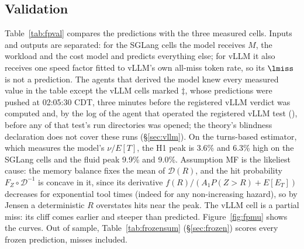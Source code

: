 \subsection{Validation}\label{sec:fp-val}
Table~\ref{tab:fpval} compares the predictions with the three measured cells. Inputs and outputs are separated: for the SGLang cells the model receives $M$, the workload and the cost model and predicts everything else; for vLLM it also receives one speed factor fitted to vLLM's own all-miss token rate, so its $\lmiss$ is not a prediction. The agents that derived the model knew every measured value in the table except the vLLM cells marked $\ddagger$, whose predictions were pushed at 02:05:30 CDT, three minutes before the registered vLLM verdict was computed and, by the log of the agent that operated the registered vLLM test (), before any of that test's run directories was opened; the theory's blindness declaration does not cover these runs (\S\ref{sec:vllm}). On the turns-based estimator, which measures the model's $\nu/E[T]$, the H1 peak is 3.6\% and 6.3\% high on the SGLang cells and the fluid peak 9.9\% and 9.0\%. Assumption MF is the likeliest cause: the memory balance fixes the mean of $\mathcal D(R)$, and the hit probability $F_Z\circ\mathcal D^{-1}$ is concave in it, since its derivative $f(R)/(A_1P(Z>R)+E[E_T])$ decreases for exponential tool times (indeed for any non-increasing hazard), so by Jensen a deterministic $R$ overstates hits near the peak. The vLLM cell is a partial miss: its cliff comes earlier and steeper than predicted. Figure~\ref{fig:fpmu} shows the curves. Out of sample, Table~\ref{tab:frozensum} (\S\ref{sec:frozen}) scores every frozen prediction, misses included.

